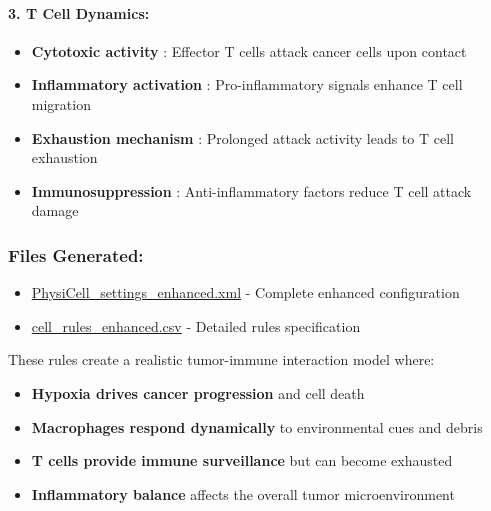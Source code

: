 \hypertarget{t-cell-dynamics}{%
\paragraph{\texorpdfstring{\textbf{3. T Cell
Dynamics:}}{3. T Cell Dynamics:}}\label{t-cell-dynamics}}

\begin{itemize}
\tightlist
\item
  \textbf{Cytotoxic activity} : Effector T cells attack cancer cells
  upon contact
\item
  \textbf{Inflammatory activation} : Pro-inflammatory signals enhance T
  cell migration
\item
  \textbf{Exhaustion mechanism} : Prolonged attack activity leads to T
  cell exhaustion
\item
  \textbf{Immunosuppression} : Anti-inflammatory factors reduce T cell
  attack damage
\end{itemize}

\hypertarget{files-generated}{%
\subsubsection{\texorpdfstring{\textbf{Files
Generated:}}{Files Generated:}}\label{files-generated}}

\begin{itemize}
\tightlist
\item
  \href{vscode-file://vscode-app/usr/share/code/resources/app/out/vs/code/electron-browser/workbench/workbench.html}{PhysiCell\_settings\_enhanced.xml}
  - Complete enhanced configuration
\item
  \href{vscode-file://vscode-app/usr/share/code/resources/app/out/vs/code/electron-browser/workbench/workbench.html}{cell\_rules\_enhanced.csv}
  - Detailed rules specification
\end{itemize}

These rules create a realistic tumor-immune interaction model where:

\begin{itemize}
\tightlist
\item
  \textbf{Hypoxia drives cancer progression} and cell death
\item
  \textbf{Macrophages respond dynamically} to environmental cues and
  debris
\item
  \textbf{T cells provide immune surveillance} but can become exhausted
\item
  \textbf{Inflammatory balance} affects the overall tumor
  microenvironment
\end{itemize}

